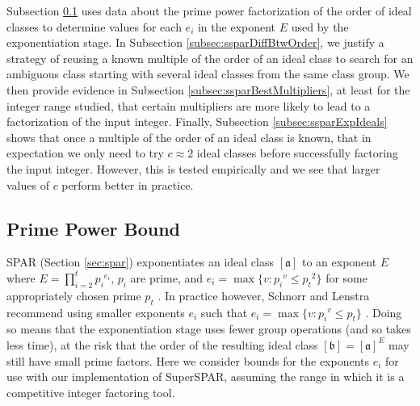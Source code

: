 \documentclass{ucalgthes1}
\theoremstyle{definition}
\newcommand{\ideal}{\mathfrak}
\newcommand{\idealclass}[1]{\left[ \ideal #1 \right]}
\newcommand{\aclass}{\idealclass a}
\newcommand{\bclass}{\idealclass b}
\begin{document}
Subsection \ref{subsec:ssparPrimePowerBound} uses data about the prime power factorization of the order of ideal classes to determine values for each $e_i$ in the exponent $E$ used by the exponentiation stage.  In Subsection \ref{subsec:ssparDiffBtwOrder}, we justify a strategy of reusing a known multiple of the order of an ideal class to search for an ambiguous class starting with several ideal classes from the same class group.  We then provide evidence in Subsection \ref{subsec:ssparBestMultipliers}, at least for the integer range studied, that certain multipliers are more likely to lead to a factorization of the input integer.  Finally, Subsection \ref{subsec:ssparExpIdeals} shows that once a multiple of the order of an ideal class is known, that in expectation we only need to try $c \approx 2$ ideal classes before successfully factoring the input integer.  However, this is tested empirically and we see that larger values of $c$ perform better in practice.


\subsection{Prime Power Bound}
\label{subsec:ssparPrimePowerBound}

SPAR (Section \ref{sec:spar}) exponentiates an ideal class $\aclass$ to an exponent $E$ where $E = \prod_{i=2}^t {p_i}^{e_i}$, $p_i$ are prime, and $e_i = \max \{ v : {p_i}^v \le {p_t}^2 \}$ for some appropriately chosen prime $p_t$ \cite[p.290]{Schnorr1984}.  In practice however, Schnorr and Lenstra recommend using smaller exponents $e_i$ such that $e_i = \max \{ v : {p_i}^v \le p_t \}$ \cite[p.293]{Schnorr1984}.  Doing so means that the exponentiation stage uses fewer group operations (and so takes less time), at the risk that the order of the resulting ideal class $\bclass = \aclass ^ E$ may still have small prime factors.  Here we consider bounds for the exponents $e_i$ for use with our implementation of SuperSPAR, assuming the range in which it is a competitive integer factoring tool.
\end{document}

